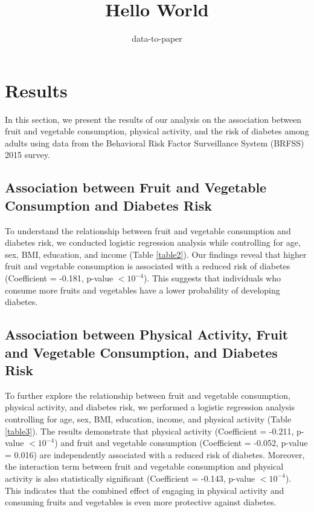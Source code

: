 \documentclass[12pt]{article}
\title{Hello World}
\author{data-to-paper}
\begin{document}
\maketitle

\section{Results}

In this section, we present the results of our analysis on the association between fruit and vegetable consumption, physical activity, and the risk of diabetes among adults using data from the Behavioral Risk Factor Surveillance System (BRFSS) 2015 survey.

\subsection{Association between Fruit and Vegetable Consumption and Diabetes Risk}

To understand the relationship between fruit and vegetable consumption and diabetes risk, we conducted logistic regression analysis while controlling for age, sex, BMI, education, and income (Table \ref{table2}). Our findings reveal that higher fruit and vegetable consumption is associated with a reduced risk of diabetes (Coefficient = -0.181, p-value $<10^{-4}$). This suggests that individuals who consume more fruits and vegetables have a lower probability of developing diabetes.

\subsection{Association between Physical Activity, Fruit and Vegetable Consumption, and Diabetes Risk}

To further explore the relationship between fruit and vegetable consumption, physical activity, and diabetes risk, we performed a logistic regression analysis controlling for age, sex, BMI, education, income, and physical activity (Table \ref{table3}). The results demonstrate that physical activity (Coefficient = -0.211, p-value $<10^{-4}$) and fruit and vegetable consumption (Coefficient = -0.052, p-value = 0.016) are independently associated with a reduced risk of diabetes. Moreover, the interaction term between fruit and vegetable consumption and physical activity is also statistically significant (Coefficient = -0.143, p-value $<10^{-4}$). This indicates that the combined effect of engaging in physical activity and consuming fruits and vegetables is even more protective against diabetes.
\end{document}
